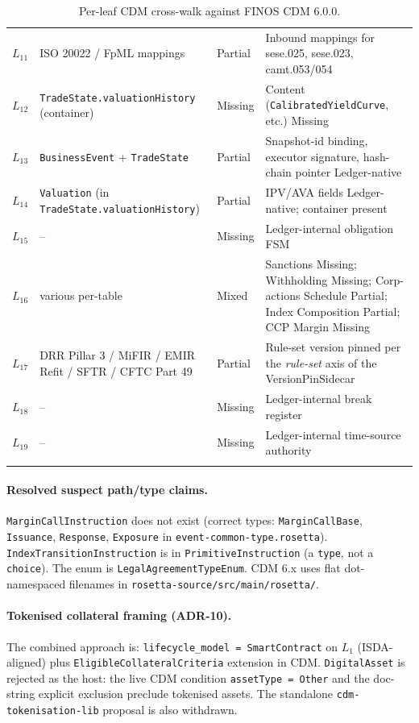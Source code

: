 \documentclass[11pt,a4paper]{article}
\begin{document}
\begin{center}
\begin{longtable}{@{}p{1cm}p{4.5cm}p{2cm}p{8.0cm}@{}}
$L_{11}$ & ISO 20022 / FpML mappings                           & Partial  & Inbound mappings for sese.025, sese.023, camt.053/054 \\
$L_{12}$ & \texttt{TradeState.valuationHistory} (container)    & Missing  & Content (\texttt{CalibratedYieldCurve}, etc.) Missing \\
$L_{13}$ & \texttt{BusinessEvent} + \texttt{TradeState}        & Partial  & Snapshot-id binding, executor signature, hash-chain pointer Ledger-native \\
$L_{14}$ & \texttt{Valuation} (in \texttt{TradeState.valuationHistory}) & Partial & IPV/AVA fields Ledger-native; container present \\
$L_{15}$ & --                                                  & Missing  & Ledger-internal obligation FSM \\
$L_{16}$ & various per-table                                   & Mixed    & Sanctions Missing; Withholding Missing; Corp-actions Schedule Partial; Index Composition Partial; CCP Margin Missing \\
$L_{17}$ & DRR Pillar 3 / MiFIR / EMIR Refit / SFTR / CFTC Part 49 & Partial & Rule-set version pinned per the \emph{rule-set} axis of the VersionPinSidecar \\
$L_{18}$ & --                                                  & Missing  & Ledger-internal break register \\
$L_{19}$ & --                                                  & Missing  & Ledger-internal time-source authority \\
\caption{Per-leaf CDM cross-walk against FINOS CDM 6.0.0.}
\label{tab:cdm-perleaf}
\end{longtable}
\end{center}

\paragraph{Resolved suspect path/type claims.} \texttt{MarginCallInstruction} does not exist (correct types: \texttt{MarginCallBase}, \texttt{Issuance}, \texttt{Response}, \texttt{Exposure} in \texttt{event-common-type.rosetta}). \texttt{IndexTransitionInstruction} is in \texttt{PrimitiveInstruction} (a \texttt{type}, not a \texttt{choice}). The enum is \texttt{LegalAgreementTypeEnum}. CDM 6.x uses flat dot-namespaced filenames in \texttt{rosetta-source/src/main/rosetta/}.

\paragraph{Tokenised collateral framing (ADR-10).} The combined approach is: \texttt{lifecycle\_model = SmartContract} on $L_1$ (ISDA-aligned) plus \texttt{EligibleCollateralCriteria} extension in CDM. \texttt{DigitalAsset} is rejected as the host: the live CDM condition \texttt{assetType = Other} and the doc-string explicit exclusion preclude tokenised assets. The standalone \texttt{cdm-tokenisation-lib} proposal is also withdrawn.
\end{document}
